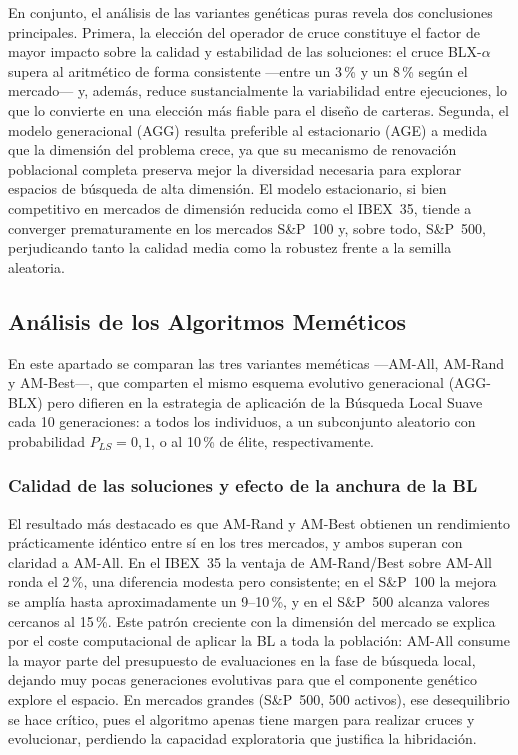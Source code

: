 En conjunto, el análisis de las variantes genéticas puras revela dos conclusiones principales. Primera, la elección del operador de cruce constituye el factor de mayor impacto sobre la calidad y estabilidad de las soluciones: el cruce BLX-$\alpha$ supera al aritmético de forma consistente ---entre un 3\,\% y un 8\,\% según el mercado--- y, además, reduce sustancialmente la variabilidad entre ejecuciones, lo que lo convierte en una elección más fiable para el diseño de carteras. Segunda, el modelo generacional (AGG) resulta preferible al estacionario (AGE) a medida que la dimensión del problema crece, ya que su mecanismo de renovación poblacional completa preserva mejor la diversidad necesaria para explorar espacios de búsqueda de alta dimensión. El modelo estacionario, si bien competitivo en mercados de dimensión reducida como el IBEX~35, tiende a converger prematuramente en los mercados S\&P~100 y, sobre todo, S\&P~500, perjudicando tanto la calidad media como la robustez frente a la semilla aleatoria.

\subsection{Análisis de los Algoritmos Meméticos}

En este apartado se comparan las tres variantes meméticas ---AM-All, AM-Rand y AM-Best---, que comparten el mismo esquema evolutivo generacional (AGG-BLX) pero difieren en la estrategia de aplicación de la Búsqueda Local Suave cada 10 generaciones: a todos los individuos, a un subconjunto aleatorio con probabilidad $P_{LS}=0{,}1$, o al 10\,\% de élite, respectivamente.

\subsubsection*{Calidad de las soluciones y efecto de la anchura de la BL}

El resultado más destacado es que AM-Rand y AM-Best obtienen un rendimiento prácticamente idéntico entre sí en los tres mercados, y ambos superan con claridad a AM-All. En el IBEX~35 la ventaja de AM-Rand/Best sobre AM-All ronda el 2\,\%, una diferencia modesta pero consistente; en el S\&P~100 la mejora se amplía hasta aproximadamente un 9--10\,\%, y en el S\&P~500 alcanza valores cercanos al 15\,\%. Este patrón creciente con la dimensión del mercado se explica por el coste computacional de aplicar la BL a toda la población: AM-All consume la mayor parte del presupuesto de evaluaciones en la fase de búsqueda local, dejando muy pocas generaciones evolutivas para que el componente genético explore el espacio. En mercados grandes (S\&P~500, 500 activos), ese desequilibrio se hace crítico, pues el algoritmo apenas tiene margen para realizar cruces y evolucionar, perdiendo la capacidad exploratoria que justifica la hibridación.


